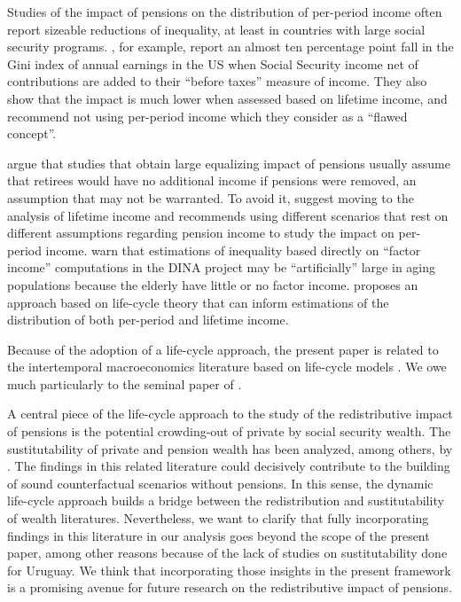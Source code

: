 \documentclass{article}
\begin{document}
Studies of the impact of pensions on the distribution of per-period income often report sizeable reductions of inequality, at least in countries with large social security programs. \textcite{Coronado2011}, for example, report an almost ten percentage point fall in the Gini index of annual earnings in the US when Social Security income net of contributions are added to their ``before taxes'' measure of income. They also show that the impact is much lower when assessed based on lifetime income, and recommend not using per-period income which they consider as a ``flawed concept''. 

\textcite{Coronado2011, Lustig2022c} argue that studies that obtain large equalizing impact of pensions usually assume that retirees would have no additional income if pensions were removed, an assumption that may not be warranted. To avoid it, \citeauthor{Coronado2011} suggest moving to the analysis of lifetime income and \citeauthor{Lustig2022c} recommends using different scenarios that rest on different assumptions regarding pension income to study the impact on per-period income. \textcite{Blanchet2021, Piketty2018} warn that estimations of inequality based directly on ``factor income'' computations in the DINA project may be ``artificially'' large in aging populations because the elderly have little or no factor income.
 \textcite{Forteza2017, Forteza2023} proposes an approach based on life-cycle theory that can inform estimations of the distribution of both per-period and lifetime income.
 
Because of the adoption of a life-cycle approach, the present paper is related to the intertemporal macroeconomics literature based on life-cycle models \parencite[for textbook presentations, see][]{Azariadis1993, Croix2002, McCandless1991, Auerbach1987, Feldstein2002}. We owe much particularly to the seminal paper of \textcite{Feldstein1974a}.  

A central piece of the life-cycle approach to the study of the redistributive impact of pensions is the potential crowding-out of private by social security wealth. The sustitutability of private and pension wealth has been analyzed, among others, by \textcite{Attanasio2003a, Attanasio2003b, Gale1998, Feldstein1974a, Alessie2013}. The findings in this related literature could decisively contribute to the building of sound counterfactual scenarios without pensions. In this sense, the dynamic life-cycle approach builds a bridge between the redistribution and sustitutability of wealth literatures. Nevertheless, we want to clarify that fully incorporating findings in this literature in our analysis goes beyond the scope of the present paper, among other reasons because of the lack of studies on sustitutability done for Uruguay. We think that incorporating those insights in the present framework is a promising avenue for future research on the redistributive impact of pensions.
\end{document}
